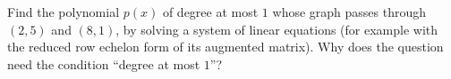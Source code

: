 Find the polynomial $p(x)$ of degree at most $1$ whose graph passes through $(2,5)$ and $(8,1)$, by solving a system of linear equations (for example with the reduced row echelon form of its augmented matrix). Why does the question need the condition ``degree at most $1$''?
